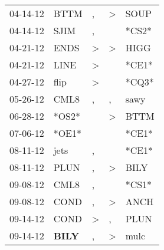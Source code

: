 \begin{supertabular}{p{0.07\textwidth}p{0.06\textwidth}p{0.02\textwidth}p{0.02\textwidth}p{0.06\textwidth}}
          04-14-12\textsuperscript{} &           BTTM\textsuperscript{} &                , &     \textgreater &           SOUP\textsuperscript{} \\
          04-14-12\textsuperscript{} &           SJIM\textsuperscript{} &                , &                  &                            *CS2* \\
          04-21-12\textsuperscript{} &           ENDS\textsuperscript{} &     \textgreater &     \textgreater &           HIGG\textsuperscript{} \\
          04-21-12\textsuperscript{} &           LINE\textsuperscript{} &     \textgreater &                  &                            *CE1* \\
          04-27-12\textsuperscript{} &           flip\textsuperscript{} &     \textgreater &                  &                            *CQ3* \\
          05-26-12\textsuperscript{} &           CML8\textsuperscript{} &                , &                , &           sawy\textsuperscript{} \\
          06-28-12\textsuperscript{} &                            *OS2* &                  &     \textgreater &           BTTM\textsuperscript{} \\
          07-06-12\textsuperscript{} &                            *OE1* &                  &                  &                            *CE1* \\
          08-11-12\textsuperscript{} &           jets\textsuperscript{} &                , &                  &                            *CE1* \\
          08-11-12\textsuperscript{} &           PLUN\textsuperscript{} &                , &     \textgreater &           BILY\textsuperscript{} \\
          09-08-12\textsuperscript{} &           CML8\textsuperscript{} &                , &                  &                            *CS1* \\
          09-08-12\textsuperscript{} &           COND\textsuperscript{} &                , &     \textgreater &           ANCH\textsuperscript{} \\
          09-14-12\textsuperscript{} &           COND\textsuperscript{} &     \textgreater &                , &           PLUN\textsuperscript{} \\
          09-14-12\textsuperscript{} &  \textbf{BILY\textsuperscript{}} &                , &     \textgreater &           mulc\textsuperscript{} \\

\end{supertabular}
